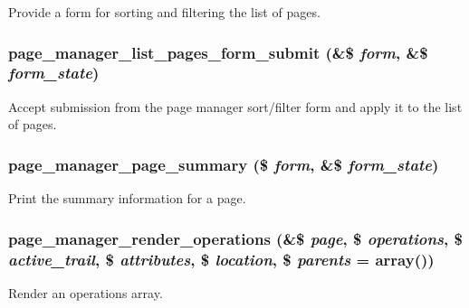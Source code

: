 \label{page__manager_8admin_8inc_a69d5a1c5ff1ecf2d5b566dfaeeb2ae54}
Provide a form for sorting and filtering the list of pages. \hypertarget{page__manager_8admin_8inc_a148b43b1d53e788722edc7f8f1c8dc76}{
\subsubsection[{page\_\-manager\_\-list\_\-pages\_\-form\_\-submit}]{\setlength{\rightskip}{0pt plus 5cm}page\_\-manager\_\-list\_\-pages\_\-form\_\-submit (\&\$ {\em form}, \/  \&\$ {\em form\_\-state})}}
\label{page__manager_8admin_8inc_a148b43b1d53e788722edc7f8f1c8dc76}
Accept submission from the page manager sort/filter form and apply it to the list of pages. \hypertarget{page__manager_8admin_8inc_a1151aa10f7c2d1f78f59c62716dd3958}{
\subsubsection[{page\_\-manager\_\-page\_\-summary}]{\setlength{\rightskip}{0pt plus 5cm}page\_\-manager\_\-page\_\-summary (\$ {\em form}, \/  \&\$ {\em form\_\-state})}}
\label{page__manager_8admin_8inc_a1151aa10f7c2d1f78f59c62716dd3958}
Print the summary information for a page. \hypertarget{page__manager_8admin_8inc_a64632eddea1e6b4a366b399fdc13e95a}{
\subsubsection[{page\_\-manager\_\-render\_\-operations}]{\setlength{\rightskip}{0pt plus 5cm}page\_\-manager\_\-render\_\-operations (\&\$ {\em page}, \/  \$ {\em operations}, \/  \$ {\em active\_\-trail}, \/  \$ {\em attributes}, \/  \$ {\em location}, \/  \$ {\em parents} = {\ttfamily array()})}}
\label{page__manager_8admin_8inc_a64632eddea1e6b4a366b399fdc13e95a}
Render an operations array.

